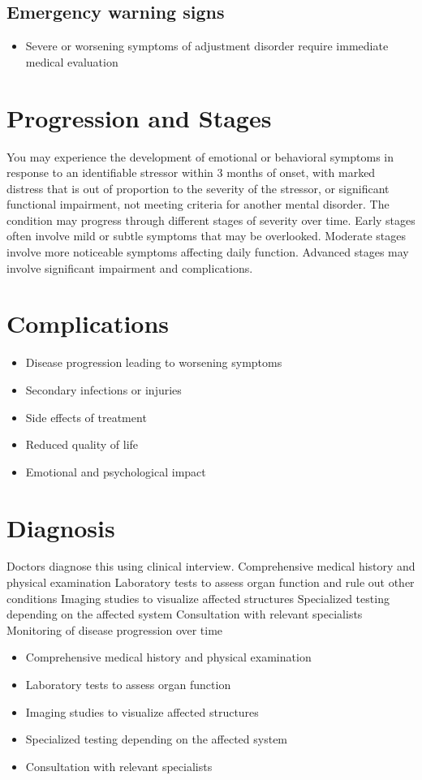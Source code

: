 \subsection{Emergency warning signs}
\begin{itemize}[noitemsep]
  \item Severe or worsening symptoms of adjustment disorder require immediate medical evaluation
\end{itemize}
\section{Progression and Stages}
You may experience the development of emotional or behavioral symptoms in response to an identifiable stressor within 3 months of onset, with marked distress that is out of proportion to the severity of the stressor, or significant functional impairment, not meeting criteria for another mental disorder. The condition may progress through different stages of severity over time. Early stages often involve mild or subtle symptoms that may be overlooked. Moderate stages involve more noticeable symptoms affecting daily function. Advanced stages may involve significant impairment and complications.
\section{Complications}
\begin{itemize}[noitemsep]
  \item Disease progression leading to worsening symptoms
  \item Secondary infections or injuries
  \item Side effects of treatment
  \item Reduced quality of life
  \item Emotional and psychological impact
\end{itemize}
\section{Diagnosis}
Doctors diagnose this using clinical interview. Comprehensive medical history and physical examination Laboratory tests to assess organ function and rule out other conditions Imaging studies to visualize affected structures Specialized testing depending on the affected system Consultation with relevant specialists Monitoring of disease progression over time

\begin{itemize}[noitemsep]
  \item Comprehensive medical history and physical examination
  \item Laboratory tests to assess organ function
  \item Imaging studies to visualize affected structures
  \item Specialized testing depending on the affected system
  \item Consultation with relevant specialists
\end{itemize}
